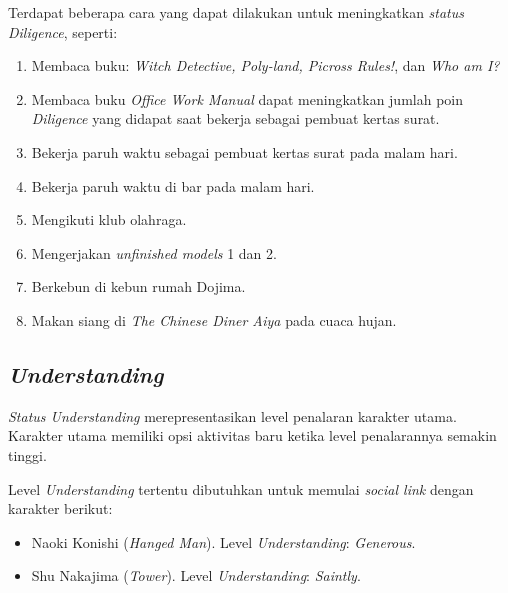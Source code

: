 Terdapat beberapa cara yang dapat dilakukan untuk meningkatkan \textit{status Diligence}, seperti:
\begin{enumerate}
    \item Membaca buku: \textit{ Witch Detective, Poly-land, Picross Rules!}, dan \textit{Who am I?}
    \item Membaca buku \textit{Office Work Manual} dapat meningkatkan jumlah poin \textit{Diligence} yang didapat saat bekerja sebagai pembuat kertas surat.
    \item Bekerja paruh waktu sebagai pembuat kertas surat pada malam hari.
    \item Bekerja paruh waktu di bar pada malam hari.
    \item Mengikuti klub olahraga.
    \item Mengerjakan \textit{unfinished models} 1 dan 2.
    \item Berkebun di kebun rumah Dojima.
    \item Makan siang di \textit{The Chinese Diner Aiya} pada cuaca hujan.
\end{enumerate}

\subsection{\textit{Understanding}}
\textit{Status Understanding} merepresentasikan level penalaran karakter utama. Karakter utama memiliki opsi aktivitas baru ketika level penalarannya semakin tinggi.

Level \textit{Understanding} tertentu dibutuhkan untuk memulai \textit{social link} dengan karakter berikut:
\begin{itemize}
    \item Naoki Konishi (\textit{Hanged Man}). Level \textit{Understanding}: \textit{Generous}.
    \item Shu Nakajima (\textit{Tower}). Level \textit{Understanding}: \textit{Saintly}.
\end{itemize}

